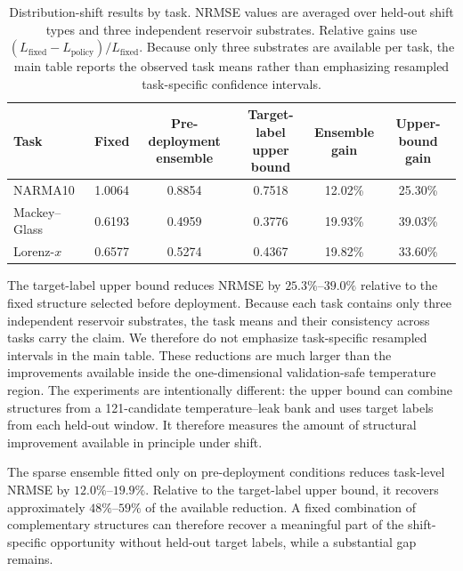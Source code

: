 \documentclass[11pt,a4paper]{article}
\begin{document}
\begin{table}[H]
\centering
\caption{Distribution-shift results by task. NRMSE values are averaged over held-out shift types and three independent reservoir substrates. Relative gains use $(L_{\mathrm{fixed}}-L_{\mathrm{policy}})/L_{\mathrm{fixed}}$. Because only three substrates are available per task, the main table reports the observed task means rather than emphasizing resampled task-specific confidence intervals.}
\label{tab:shift_task_results}
\small
\setlength{\tabcolsep}{4.5pt}
\begin{tabular}{lccccc}
\toprule
Task & Fixed & \shortstack{Pre-deployment\\ensemble} & \shortstack{Target-label\\upper bound} & \shortstack{Ensemble\\gain} & \shortstack{Upper-bound\\gain} \\
\midrule
NARMA10 & 1.0064 & 0.8854 & 0.7518 & 12.02\% & 25.30\% \\
Mackey--Glass & 0.6193 & 0.4959 & 0.3776 & 19.93\% & 39.03\% \\
Lorenz-$x$ & 0.6577 & 0.5274 & 0.4367 & 19.82\% & 33.60\% \\
\bottomrule
\end{tabular}
\end{table}

The target-label upper bound reduces NRMSE by $25.3\%$--$39.0\%$ relative to the fixed structure selected before deployment. Because each task contains only three independent reservoir substrates, the task means and their consistency across tasks carry the claim. We therefore do not emphasize task-specific resampled intervals in the main table. These reductions are much larger than the improvements available inside the one-dimensional validation-safe temperature region. The experiments are intentionally different: the upper bound can combine structures from a 121-candidate temperature--leak bank and uses target labels from each held-out window. It therefore measures the amount of structural improvement available in principle under shift.

The sparse ensemble fitted only on pre-deployment conditions reduces task-level NRMSE by $12.0\%$--$19.9\%$. Relative to the target-label upper bound, it recovers approximately $48\%$--$59\%$ of the available reduction. A fixed combination of complementary structures can therefore recover a meaningful part of the shift-specific opportunity without held-out target labels, while a substantial gap remains.
\end{document}
